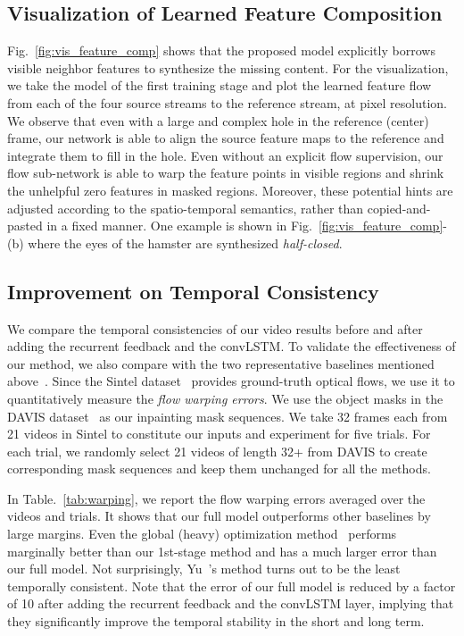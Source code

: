 \documentclass[10pt,twocolumn,letterpaper]{article}
\newcommand{\figref}[1]{Fig.~\ref{#1}}
\newcommand{\tabref}[1]{Table.~\ref{#1}}
\begin{document}
\subsection{Visualization of Learned Feature Composition}


\figref{fig:vis_feature_comp} shows that the proposed model explicitly borrows visible neighbor features to synthesize the missing content. 
For the visualization, we take the model of the first training stage and plot the learned feature flow from each of the four source streams to the reference stream, at  pixel resolution.
We observe that even with a large and complex hole in the reference (center) frame, our network is able to align the source feature maps to the reference and integrate them to fill in the hole. Even without an explicit flow supervision, our flow sub-network is able to warp the feature points in visible regions and shrink the unhelpful zero features in masked regions. Moreover, these potential hints are adjusted according to the spatio-temporal semantics, rather than copied-and-pasted in a fixed manner. One example is shown in \figref{fig:vis_feature_comp}-(b) where the eyes of the hamster are synthesized \textit{half-closed}. 


\subsection{Improvement on Temporal Consistency}
\label{sec:TC}
We compare the temporal consistencies of our video results before and after adding the recurrent feedback and the convLSTM. To validate the effectiveness of our method, we also compare with the two representative baselines mentioned above~\cite{yu2018generative,huang2016temporally}. Since the Sintel dataset~\cite{butler2012naturalistic} provides ground-truth optical flows, we use it to quantitatively measure the \textit{flow warping errors}\cite{lai2018learning}.  We use the object masks in the DAVIS dataset~\cite{perazzi2016benchmark, pont20172017} as our inpainting mask sequences. We take 32 frames each from 21 videos in Sintel to constitute our inputs and experiment for five trials. For each trial, we randomly select 21 videos of length 32+ from DAVIS to create corresponding mask sequences and keep them unchanged for all the methods. 



In \tabref{tab:warping}, we report the flow warping errors averaged over the videos and trials. It shows that our full model outperforms other baselines by large margins. Even the global (heavy) optimization method~\cite{huang2016temporally} performs marginally better than our 1st-stage method and has a much larger error than our full model. Not surprisingly, Yu~\etal's method turns out to be the least temporally consistent. Note that the error of our full model is reduced by a factor of 10 after adding the recurrent feedback and the convLSTM layer, implying that they significantly improve the temporal stability in the short and long term.
\end{document}

